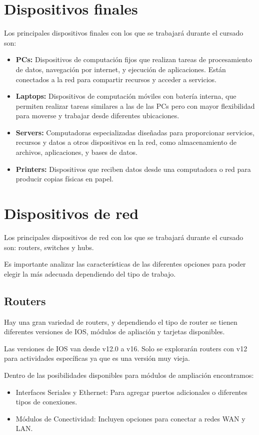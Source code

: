 \documentclass[11pt, a4paper]{article}
\begin{document}
\section{Dispositivos finales}
Los principales dispositivos finales con los que se trabajará durante el cursado son:
\begin{itemize}
    \item \textbf{PCs:} Dispositivos de computación fijos que realizan tareas de procesamiento de datos, navegación por internet, y ejecución de aplicaciones. Están conectados a la red para compartir recursos y acceder a servicios.
    \item \textbf{Laptops:} Dispositivos de computación móviles con batería interna, que permiten realizar tareas similares a las de las PCs pero con mayor flexibilidad para moverse y trabajar desde diferentes ubicaciones.
    \item \textbf{Servers:} Computadoras especializadas diseñadas para proporcionar servicios, recursos y datos a otros dispositivos en la red, como almacenamiento de archivos, aplicaciones, y bases de datos.
    \item \textbf{Printers:} Dispositivos que reciben datos desde una computadora o red para producir copias físicas en papel.

\end{itemize}
\section{Dispositivos de red}
Los principales dispositivos de red con los que se trabajará durante el cursado son: routers, switches y hubs.

Es importante analizar las características de las diferentes opciones para poder elegir la más adecuada dependiendo del tipo de trabajo.
\subsection{Routers}
Hay una gran variedad de routers, y dependiendo el tipo de router se tienen diferentes versiones de IOS, módulos de apliación y tarjetas disponibles.

Las versiones de IOS van desde v12.0 a v16. Solo se explorarán routers con v12 para actividades específicas ya que es una versión muy vieja.

Dentro de las posibilidades disponibles para módulos de ampliación encontramos:
\begin{itemize}
    \item Interfaces Seriales y Ethernet: Para agregar puertos adicionales o diferentes tipos de conexiones.
    \item Módulos de Conectividad: Incluyen opciones para conectar a redes WAN y LAN.
\end{itemize}
\end{document}
